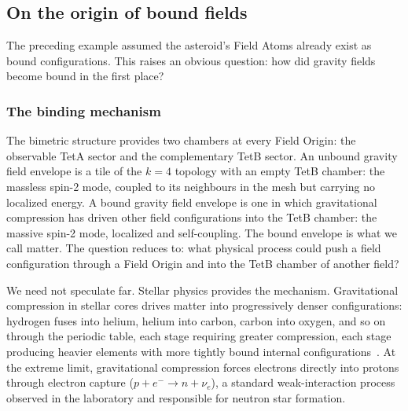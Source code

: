 \documentclass[aps,prd,preprint,superscriptaddress,showpacs,preprintnumbers,amsmath,amssymb,nofootinbib]{revtex4-2}
\begin{document}
\subsection{On the origin of bound fields}
\label{subsec:bound-origin}

The preceding example assumed the asteroid's Field Atoms already exist as bound configurations. This raises an obvious question: how did gravity fields become bound in the first place?

\subsubsection*{The binding mechanism}

The bimetric structure provides two chambers at every Field Origin: the observable TetA sector and the complementary TetB sector. An unbound gravity field envelope is a tile of the $k = 4$ topology with an empty TetB chamber: the massless spin-2 mode, coupled to its neighbours in the mesh but carrying no localized energy. A bound gravity field envelope is one in which gravitational compression has driven other field configurations into the TetB chamber: the massive spin-2 mode, localized and self-coupling. The bound envelope is what we call matter. The question reduces to: what physical process could push a field configuration through a Field Origin and into the TetB chamber of another field?

We need not speculate far. Stellar physics provides the mechanism. Gravitational compression in stellar cores drives matter into progressively denser configurations: hydrogen fuses into helium, helium into carbon, carbon into oxygen, and so on through the periodic table, each stage requiring greater compression, each stage producing heavier elements with more tightly bound internal configurations~\cite{burbidge1957}. At the extreme limit, gravitational compression forces electrons directly into protons through electron capture ($p + e^- \to n + \nu_e$), a standard weak-interaction process observed in the laboratory and responsible for neutron star formation.
\end{document}
